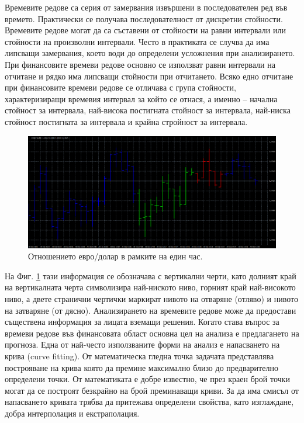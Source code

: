 \documentclass[book,14pt,oneside,openany]{memoir}
\begin{document}
Времевите редове са серия от замервания извършени в последователен ред във времето. Практически се получава последователност от дискретни стойности. Времевите редове могат да са съставени от стойности на равни интервали или стойности на произволни интервали. Често в практиката се случва да има липсващи замервания, което води до определени усложнения при анализирането. При финансовите времеви редове основно се използват равни интервали на отчитане и рядко има липсващи стойности при отчитането. Всяко едно отчитане при финансовите времеви редове се отличава с група стойности, характеризиращи времевия интервал за който се отнася, а именно – начална стойност за интервала, най-висока постигната стойност за интервала, най-ниска стойност постигната за интервала и крайна стройност за интервала. 

\begin{figure}[h!]
  \centering
  \includegraphics[width=1.0\linewidth]{./images/pic0003.png}
  \caption{Отношението евро/долар в рамките на един час.}
\label{fig:pic0003}
\end{figure}

На Фиг. \ref{fig:pic0003} тази информация се обозначава с вертикални черти, като долният край на вертикалната черта символизира най-ниското ниво, горният край най-високото ниво, а двете странични чертички маркират нивото на отваряне (отляво) и нивото на затваряне (от дясно). Анализирането на времевите редове може да предостави съществена информация за лицата вземащи решения. Когато става въпрос за времеви редове във финансовата област основна цел на анализа е предлагането на прогноза. Една от най-често използваните форми на анализ е напасването на крива (curve fitting). От математическа гледна точка задачата представлява построяване на крива която да премине максимално близо до предварително определени точки. От математиката е добре известно, че през краен брой точки могат да се построят безкрайно на брой преминаващи криви. За да има смисъл от напасването кривата трябва да притежава определени свойства, като изглаждане, добра интерполация и екстраполация. 
\end{document}
